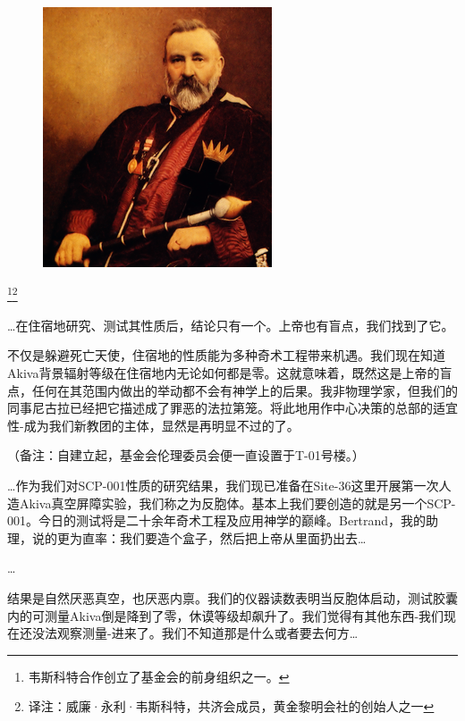 \hr

\begin{figure}[H]
    \centering
    \includegraphics[width=0.5\linewidth]{images/SCP-001-gods-blind-spot-4.png}
    \caption*{}
\end{figure}

\begin{scpbox}

\footnote{韦斯科特合作创立了基金会的前身组织之一。}\footnote{译注：威廉·永利·韦斯科特，共济会成员，黄金黎明会社的创始人之一}

…在住宿地研究、测试其性质后，结论只有一个。上帝也有盲点，我们找到了它。

不仅是躲避死亡天使，住宿地的性质能为多种奇术工程带来机遇。我们现在知道Akiva背景辐射等级在住宿地内无论如何都是零。这就意味着，既然这是上帝的盲点，任何在其范围内做出的举动都不会有神学上的后果。我非物理学家，但我们的同事尼古拉已经把它描述成了罪恶的法拉第笼。将此地用作中心决策的总部的适宜性-成为我们新教团的主体，显然是再明显不过的了。

\end{scpbox}

（备注：自建立起，基金会伦理委员会便一直设置于T-01号楼。）

\hr

\begin{scpbox}


…作为我们对SCP-001性质的研究结果，我们现已准备在Site-36这里开展第一次人造Akiva真空屏障实验，我们称之为反胞体。基本上我们要创造的就是另一个SCP-001。今日的测试将是二十余年奇术工程及应用神学的巅峰。Bertrand，我的助理，说的更为直率：我们要造个盒子，然后把上帝从里面扔出去…

…

结果是自然厌恶真空，也厌恶内禀。我们的仪器读数表明当反胞体启动，测试胶囊内的可测量Akiva倒是降到了零，休谟等级却飙升了。我们觉得有其他东西-我们现在还没法观察测量-进来了。我们不知道那是什么或者要去何方…

\end{scpbox}


